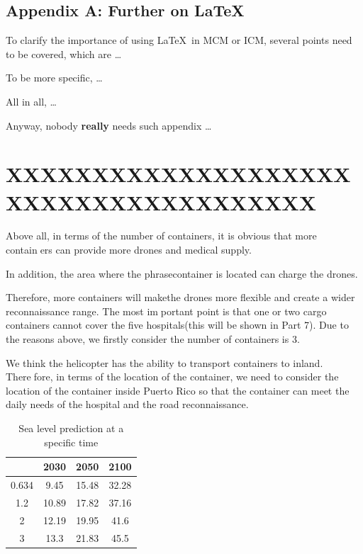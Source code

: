\documentclass[12pt]{article}  %
\begin{document}
\begin{subappendices}  %

\section{Appendix A: Further on \LaTeX}
To clarify the importance of using \LaTeX\ in MCM or ICM, several points need to be covered, which are \ldots

To be more specific, \ldots

All in all, \ldots

Anyway, nobody \textbf{really} needs such appendix \ldots

\end{subappendices}





\section{XXXXXXXXXXXXXXXXXXXXXXXXXXXXXXXXXXXXXX}

Above all, in terms of the number of containers, it is obvious that more containers can provide more drones and medical supply. 

In addition, the area where the phrasecontainer is located can charge the drones. 
	
	Therefore, more containers will makethe drones more flexible and create a wider reconnaissance range. The most important point is that one or two cargo containers cannot cover the five hospitals(this will be shown in Part 7). Due to the reasons above, we firstly consider the
	number of containers is 3.
	
	We think the helicopter has the ability to transport containers to inland. Therefore, in terms of the location of the container, we need to consider the location of the container inside Puerto Rico so that the container can meet the daily needs of
	the hospital and the road reconnaissance.


\begin{table}[htbp]
	\centering
	\caption{Sea level prediction at a specific time}
	\begin{tabular}{c|ccc}
		\toprule
		\kappa     & 2030  & 2050  & 2100 \\
		\midrule
		0.634 & 9.45  & 15.48 & 32.28 \\
		1.2   & 10.89 & 17.82 & 37.16 \\
		2     & 12.19 & 19.95 & 41.6 \\
		3     & 13.3  & 21.83 & 45.5 \\
		\bottomrule
	\end{tabular}%
	\label{tab:addlabel}%
\end{table}%
\end{document}
